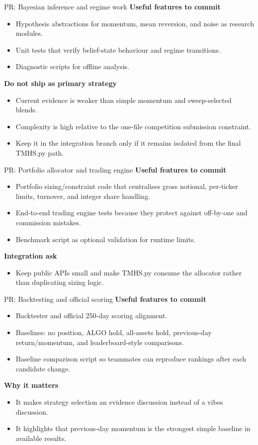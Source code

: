\documentclass[aspectratio=169]{beamer}
\begin{document}
\begin{frame}{PR: Bayesian inference and regime work}
\textbf{Useful features to commit}
\begin{itemize}
  \item Hypothesis abstractions for momentum, mean reversion, and noise as research modules.
  \item Unit tests that verify belief-state behaviour and regime transitions.
  \item Diagnostic scripts for offline analysis.
\end{itemize}
\textbf{Do not ship as primary strategy}
\begin{itemize}
  \item Current evidence is weaker than simple momentum and sweep-selected blends.
  \item Complexity is high relative to the one-file competition submission constraint.
  \item Keep it in the integration branch only if it remains isolated from the final TMHS.py path.
\end{itemize}
\end{frame}

\begin{frame}{PR: Portfolio allocator and trading engine}
\textbf{Useful features to commit}
\begin{itemize}
  \item Portfolio sizing/constraint code that centralises gross notional, per-ticker limits, turnover, and integer share handling.
  \item End-to-end trading engine tests because they protect against off-by-one and commission mistakes.
  \item Benchmark script as optional validation for runtime limits.
\end{itemize}
\textbf{Integration ask}
\begin{itemize}
  \item Keep public APIs small and make TMHS.py consume the allocator rather than duplicating sizing logic.
\end{itemize}
\end{frame}

\begin{frame}{PR: Backtesting and official scoring}
\textbf{Useful features to commit}
\begin{itemize}
  \item Backtester and official 250-day scoring alignment.
  \item Baselines: no position, ALGO hold, all-assets hold, previous-day return/momentum, and leaderboard-style comparisons.
  \item Baseline comparison script so teammates can reproduce rankings after each candidate change.
\end{itemize}
\textbf{Why it matters}
\begin{itemize}
  \item It makes strategy selection an evidence discussion instead of a vibes discussion.
  \item It highlights that previous-day momentum is the strongest simple baseline in available results.
\end{itemize}
\end{frame}
\end{document}
